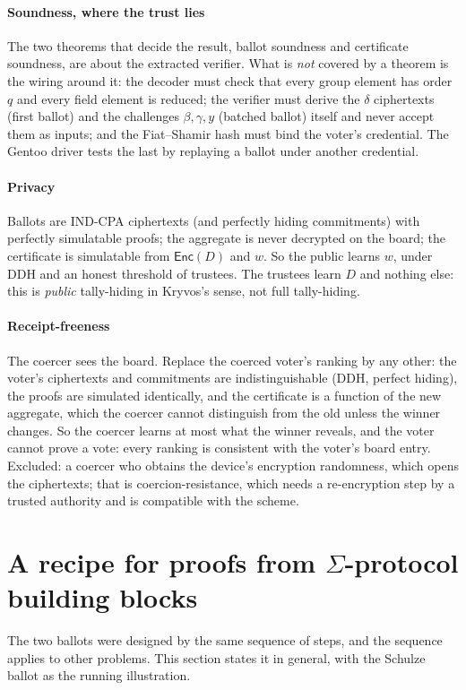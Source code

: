 \documentclass[11pt,a4paper]{article}
\newcommand{\Enc}{\mathsf{Enc}}
\theoremstyle{remark}
\begin{document}
\paragraph{Soundness, where the trust lies} The two theorems that decide
the result, ballot soundness and certificate soundness, are about the
extracted verifier. What is \emph{not} covered by a theorem is the wiring
around it: the decoder must check that every group element has order $q$
and every field element is reduced; the verifier must derive the $\delta$
ciphertexts (first ballot) and the challenges $\beta, \gamma, y$ (batched
ballot) itself and never accept them as inputs; and the Fiat--Shamir hash
must bind the voter's credential. The Gentoo driver tests the last by
replaying a ballot under another credential.

\paragraph{Privacy} Ballots are IND-CPA ciphertexts (and perfectly hiding
commitments) with perfectly simulatable proofs; the aggregate is never
decrypted on the board; the certificate is simulatable from $\Enc(D)$ and
$w$. So the public learns $w$, under DDH and an honest threshold of
trustees. The trustees learn $D$ and nothing else: this is \emph{public}
tally-hiding in Kryvos's sense, not full tally-hiding.

\paragraph{Receipt-freeness} The coercer sees the board. Replace the
coerced voter's ranking by any other: the voter's ciphertexts and
commitments are indistinguishable (DDH, perfect hiding), the proofs are
simulated identically, and the certificate is a function of the new
aggregate, which the coercer cannot distinguish from the old unless the
winner changes. So the coercer learns at most what the winner reveals, and
the voter cannot prove a vote: every ranking is consistent with the
voter's board entry. Excluded: a coercer who obtains the device's
encryption randomness, which opens the ciphertexts; that is
coercion-resistance, which needs a re-encryption step by a trusted
authority and is compatible with the scheme.

\section{A recipe for proofs from $\Sigma$-protocol building blocks}\label{sec:recipe}
The two ballots were designed by the same sequence of steps, and the
sequence applies to other problems. This section states it in general,
with the Schulze ballot as the running illustration.
\end{document}
